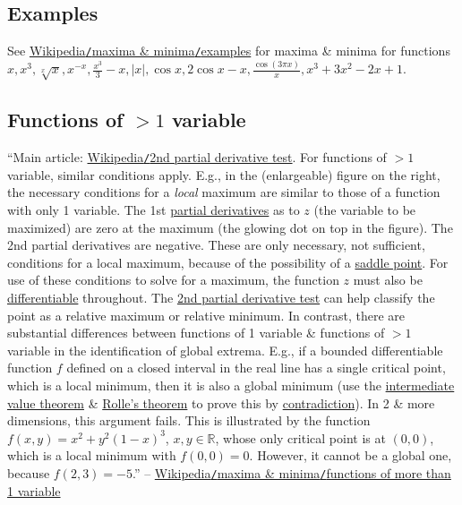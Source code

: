 \documentclass[oneside]{book}
\numberwithin{equation}{section}
\begin{document}
\subsection{Examples}
See \href{https://en.wikipedia.org/wiki/Maxima_and_minima#Examples}{Wikipedia\texttt{/}maxima \& minima\texttt{/}examples} for maxima \& minima for functions $x,x^3,\sqrt[x]{x},x^{-x},\frac{x^3}{3} - x,|x|,\cos x,2\cos x - x,\frac{\cos(3\pi x)}{x},x^3 + 3x^2 - 2x + 1$.

\subsection{Functions of $> 1$ variable}
``Main article: \href{https://en.wikipedia.org/wiki/Second_partial_derivative_test}{Wikipedia\texttt{/}2nd partial derivative test}. For functions of $> 1$ variable, similar conditions apply. E.g., in the (enlargeable) figure on the right, the necessary conditions for a \textit{local} maximum are similar to those of a function with only 1 variable. The 1st \href{https://en.wikipedia.org/wiki/Partial_derivatives}{partial derivatives} as to $z$ (the variable to be maximized) are zero at the maximum (the glowing dot on top in the figure). The 2nd partial derivatives are negative. These are only necessary, not sufficient, conditions for a local maximum, because of the possibility of a \href{https://en.wikipedia.org/wiki/Saddle_point}{saddle point}. For use of these conditions to solve for a maximum, the function $z$ must also be \href{https://en.wikipedia.org/wiki/Differentiable_function}{differentiable} throughout. The \href{https://en.wikipedia.org/wiki/Second_partial_derivative_test}{2nd partial derivative test} can help classify the point as a relative maximum or relative minimum. In contrast, there are substantial differences between functions of 1 variable \& functions of $> 1$ variable in the identification of global extrema. E.g., if a bounded differentiable function $f$ defined on a closed interval in the real line has a single critical point, which is a local minimum, then it is also a global minimum (use the \href{https://en.wikipedia.org/wiki/Intermediate_value_theorem}{intermediate value theorem} \& \href{https://en.wikipedia.org/wiki/Rolle%27s_theorem}{Rolle's theorem} to prove this by \href{https://en.wikipedia.org/wiki/Proof_by_contradiction}{contradiction}). In 2 \& more dimensions, this argument fails. This is illustrated by the function $f(x,y) = x^2 + y^2(1 - x)^3$, $x,y\in\mathbb{R}$, whose only critical point is at $(0,0)$, which is a local minimum with $f(0,0) = 0$. However, it cannot be a global one, because $f(2,3) = -5$.'' -- \href{https://en.wikipedia.org/wiki/Maxima_and_minima#Functions_of_more_than_one_variable}{Wikipedia\texttt{/}maxima \& minima\texttt{/}functions of more than 1 variable}
\end{document}
